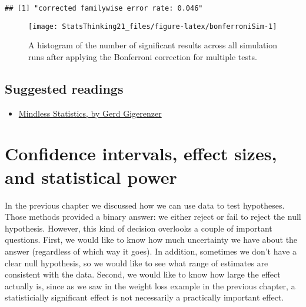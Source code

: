 \documentclass[]{book}
\newenvironment{Shaded}{\begin{snugshade}}{\end{snugshade}}
\newcommand{\KeywordTok}[1]{\textcolor[rgb]{0.13,0.29,0.53}{\textbf{#1}}}
\newcommand{\DecValTok}[1]{\textcolor[rgb]{0.00,0.00,0.81}{#1}}
\newcommand{\FloatTok}[1]{\textcolor[rgb]{0.00,0.00,0.81}{#1}}
\newcommand{\StringTok}[1]{\textcolor[rgb]{0.31,0.60,0.02}{#1}}
\newcommand{\CommentTok}[1]{\textcolor[rgb]{0.56,0.35,0.01}{\textit{#1}}}
\newcommand{\OperatorTok}[1]{\textcolor[rgb]{0.81,0.36,0.00}{\textbf{#1}}}
\newcommand{\NormalTok}[1]{#1}
\providecommand{\tightlist}{%
  \setlength{\itemsep}{0pt}\setlength{\parskip}{0pt}}
\theoremstyle{definition}
\theoremstyle{definition}
\theoremstyle{definition}
\theoremstyle{remark}
\begin{document}
\begin{Shaded}
\end{Shaded}

\begin{verbatim}
## [1] "corrected familywise error rate: 0.046"
\end{verbatim}

\begin{figure}
\texttt{[image: StatsThinking21\_files/figure-latex/bonferroniSim-1]} \caption{A histogram of the number of significant results across all simulation runs after applying the Bonferroni correction for multiple tests.}\label{fig:bonferroniSim}
\end{figure}

\section{Suggested readings}\label{suggested-readings-6}

\begin{itemize}
\tightlist
\item
  \href{https://library.mpib-berlin.mpg.de/ft/gg/GG_Mindless_2004.pdf}{Mindless
  Statistics, by Gerd Gigerenzer}
\end{itemize}

\chapter{Confidence intervals, effect sizes, and statistical
power}\label{ci-effect-size-power}

In the previous chapter we discussed how we can use data to test
hypotheses. Those methods provided a binary answer: we either reject or
fail to reject the null hypothesis. However, this kind of decision
overlooks a couple of important questions. First, we would like to know
how much uncertainty we have about the answer (regardless of which way
it goes). In addition, sometimes we don't have a clear null hypothesis,
so we would like to see what range of estimates are consistent with the
data. Second, we would like to know how large the effect actually is,
since as we saw in the weight loss example in the previous chapter, a
statisticially significant effect is not necessarily a practically
important effect.
\end{document}
